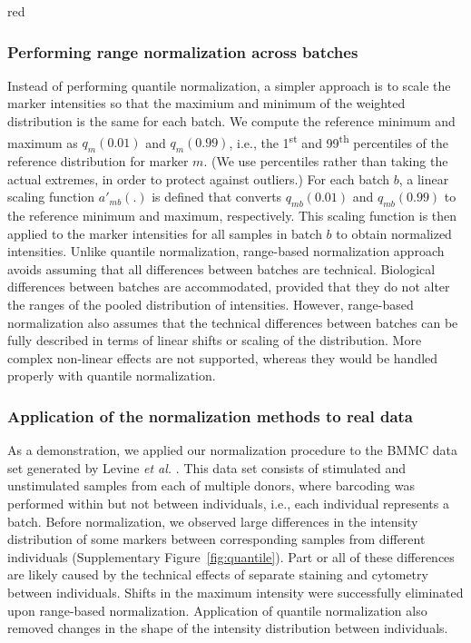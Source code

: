 \documentclass{article}
\begin{document}
\begin{color}{red}
\subsubsection{Performing range normalization across batches}
Instead of performing quantile normalization, a simpler approach is to scale the marker intensities so that the maximium and minimum of the weighted distribution is the same for each batch.
We compute the reference minimum and maximum as $q_m(0.01)$ and $q_m(0.99)$, i.e., the 1\textsuperscript{st} and 99\textsuperscript{th} percentiles of the reference distribution for marker $m$.
(We use percentiles rather than taking the actual extremes, in order to protect against outliers.)
For each batch $b$, a linear scaling function $a'_{mb}(.)$ is defined that converts $q_{mb}(0.01)$ and $q_{mb}(0.99)$ to the reference minimum and maximum, respectively.
This scaling function is then applied to the marker intensities for all samples in batch $b$ to obtain normalized intensities.
Unlike quantile normalization, range-based normalization approach avoids assuming that all differences between batches are technical.
Biological differences between batches are accommodated, provided that they do not alter the ranges of the pooled distribution of intensities.
However, range-based normalization also assumes that the technical differences between batches can be fully described in terms of linear shifts or scaling of the distribution.
More complex non-linear effects are not supported, whereas they would be handled properly with quantile normalization.

\subsubsection{Application of the normalization methods to real data}
As a demonstration, we applied our normalization procedure to the BMMC data set generated by Levine \textit{et al.} \cite{levine2015datadriven}.
This data set consists of stimulated and unstimulated samples from each of multiple donors, where barcoding was performed within but not between individuals, i.e., each individual represents a batch.
Before normalization, we observed large differences in the intensity distribution of some markers between corresponding samples from different individuals (Supplementary Figure~\ref{fig:quantile}).
Part or all of these differences are likely caused by the technical effects of separate staining and cytometry between individuals.
Shifts in the maximum intensity were successfully eliminated upon range-based normalization.
Application of quantile normalization also removed changes in the shape of the intensity distribution between individuals.


\end{color}
\end{document}
